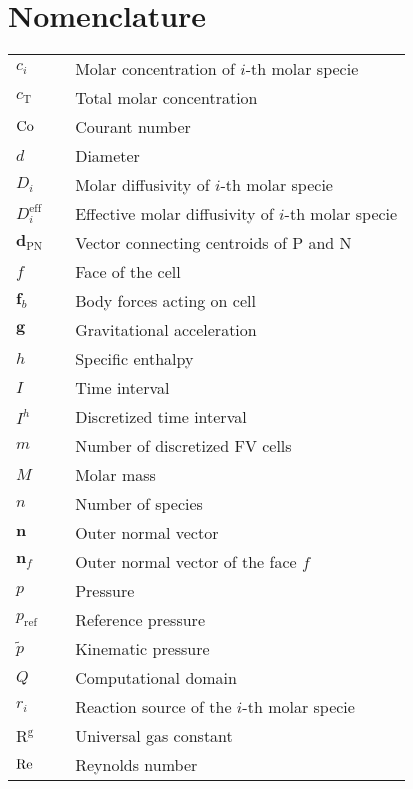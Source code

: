 \cleardoublepage
\section{Nomenclature}

\begin{longtable}{lp{}l}
    $c_i$ & \dotfill & Molar concentration of $i$-th molar specie\\
    $c_{\mathrm{T}}$ & \dotfill & Total molar concentration\\
    $\mbox{\textrm{Co}}$ & \dotfill & Courant number\\
    $d$ & \dotfill & Diameter\\
    $D_i$ & \dotfill & Molar diffusivity of $i$-th molar specie\\
    $D_i^{\mathrm{eff}}$ & \dotfill & Effective molar diffusivity of $i$-th molar specie\\
    $\bm{d}_{\mathrm{PN}}$ & \dotfill & Vector connecting centroids of P and N\\
    $f$&\dotfill & Face of the cell\\
    $\bm{f}_b$&\dotfill & Body forces acting on cell\\
    $\bm{g}$ & \dotfill & Gravitational acceleration\\
    $h$ & \dotfill & Specific enthalpy\\
    $I$ & \dotfill & Time interval\\
    $I^h$ & \dotfill & Discretized time interval\\
    ${m}$&\dotfill & Number of discretized FV cells\\
    ${M}$&\dotfill & Molar mass\\
    ${n}$&\dotfill & Number of species\\
    $\bm{n}$&\dotfill & Outer normal vector\\
    $\bm{n}_f$&\dotfill & Outer normal vector of the face $f$\\
    ${p}$ &\dotfill & Pressure\\
    ${p_{\mathrm{ref}}}$ &\dotfill & Reference pressure\\
    $\tilde{p}$ & \dotfill & Kinematic pressure\\
    $Q$ & \dotfill & Computational domain\\
    $r_i$ & \dotfill & Reaction source of the $i$-th molar specie\\
    $\mathrm{R^g}$ & \dotfill & Universal gas constant\\
    $\mbox{\textrm{Re}}$ & \dotfill & Reynolds number\\

\end{longtable}

